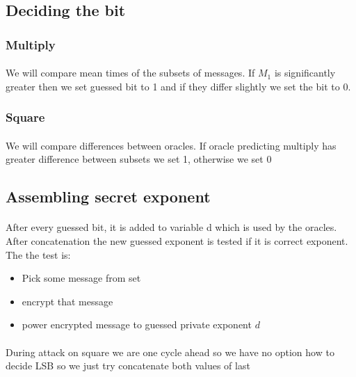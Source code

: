 \documentclass[thesis=B,english]{FITthesis}[2012/10/20]
\begin{document}
{\subsection{Deciding the bit}

\subsubsection{Multiply}
\paragraph*{}{
We will compare mean times of the subsets of messages. If \(M_1\) is significantly greater then we set guessed bit to 1 and if they differ slightly we set the bit to 0. 

}

\subsubsection{Square}
\paragraph*{}{
We will compare differences between oracles. If oracle predicting multiply has greater difference between subsets we set 1, otherwise we set 0
}

\subsection{Assembling secret exponent}
\paragraph{}{
After every guessed bit, it is added to variable d which is used by the oracles. After concatenation the new guessed exponent is tested if it is correct exponent.
The the test is:}
\begin{itemize}
 \item Pick some message from set
 \item encrypt that message
 \item power encrypted message to guessed private exponent \(d\)
\end{itemize}

\paragraph*{}{
During attack on square we are one cycle ahead so we have no option how to decide LSB so we just try concatenate both values of last  
}

}
\end{document}
